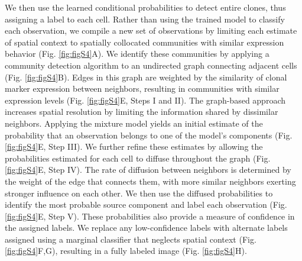 We then use the learned conditional probabilities to detect entire clones, thus assigning a label to each cell. Rather than using the trained model to classify each observation, we compile a new set of observations by limiting each estimate of spatial context to spatially collocated communities with similar expression behavior (Fig. \ref{fig:figS4}A). We identify these communities by applying a community detection algorithm to an undirected graph connecting adjacent cells (Fig. \ref{fig:figS4}B). Edges in this graph are weighted by the similarity of clonal marker expression between neighbors, resulting in communities with similar expression levels (Fig. \ref{fig:figS4}E, Steps I and II). The graph-based approach increases spatial resolution by limiting the information shared by dissimilar neighbors. Applying the mixture model yields an initial estimate of the probability that an observation belongs to one of the model's components (Fig. \ref{fig:figS4}E, Step III). We further refine these estimates by allowing the probabilities estimated for each cell to diffuse throughout the graph (Fig. \ref{fig:figS4}E, Step IV). The rate of diffusion between neighbors is determined by the weight of the edge that connects them, with more similar neighbors exerting stronger influence on each other. We then use the diffused probabilities to identify the most probable source component and label each observation (Fig. \ref{fig:figS4}E, Step V). These probabilities also provide a measure of confidence in the assigned labels. We replace any low-confidence labels with alternate labels assigned using a marginal classifier that neglects spatial context (Fig. \ref{fig:figS4}F,G), resulting in a fully labeled image (Fig. \ref{fig:figS4}H).

